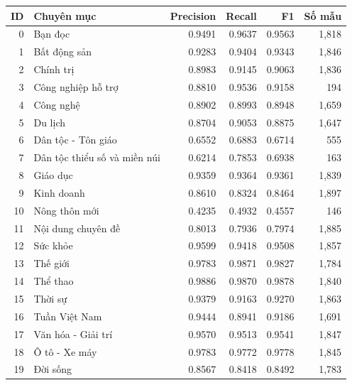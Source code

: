 \begin{tabularx}{\linewidth}{r>{\raggedright\arraybackslash}Xrrrr}
\toprule
ID & Chuyên mục & Precision & Recall & F1 & Số mẫu\\\midrule
0 & Bạn đọc & 0.9491 & 0.9637 & 0.9563 & 1,818\\
1 & Bất động sản & 0.9283 & 0.9404 & 0.9343 & 1,846\\
2 & Chính trị & 0.8983 & 0.9145 & 0.9063 & 1,836\\
3 & Công nghiệp hỗ trợ & 0.8810 & 0.9536 & 0.9158 & 194\\
4 & Công nghệ & 0.8902 & 0.8993 & 0.8948 & 1,659\\
5 & Du lịch & 0.8704 & 0.9053 & 0.8875 & 1,647\\
6 & Dân tộc - Tôn giáo & 0.6552 & 0.6883 & 0.6714 & 555\\
7 & Dân tộc thiểu số và miền núi & 0.6214 & 0.7853 & 0.6938 & 163\\
8 & Giáo dục & 0.9359 & 0.9364 & 0.9361 & 1,839\\
9 & Kinh doanh & 0.8610 & 0.8324 & 0.8464 & 1,897\\
10 & Nông thôn mới & 0.4235 & 0.4932 & 0.4557 & 146\\
11 & Nội dung chuyên đề & 0.8013 & 0.7936 & 0.7974 & 1,885\\
12 & Sức khỏe & 0.9599 & 0.9418 & 0.9508 & 1,857\\
13 & Thế giới & 0.9783 & 0.9871 & 0.9827 & 1,784\\
14 & Thể thao & 0.9886 & 0.9870 & 0.9878 & 1,840\\
15 & Thời sự & 0.9379 & 0.9163 & 0.9270 & 1,863\\
16 & Tuần Việt Nam & 0.9444 & 0.8941 & 0.9186 & 1,691\\
17 & Văn hóa - Giải trí & 0.9570 & 0.9513 & 0.9541 & 1,847\\
18 & Ô tô - Xe máy & 0.9783 & 0.9772 & 0.9778 & 1,845\\
19 & Đời sống & 0.8567 & 0.8418 & 0.8492 & 1,783\\
\bottomrule\end{tabularx}
